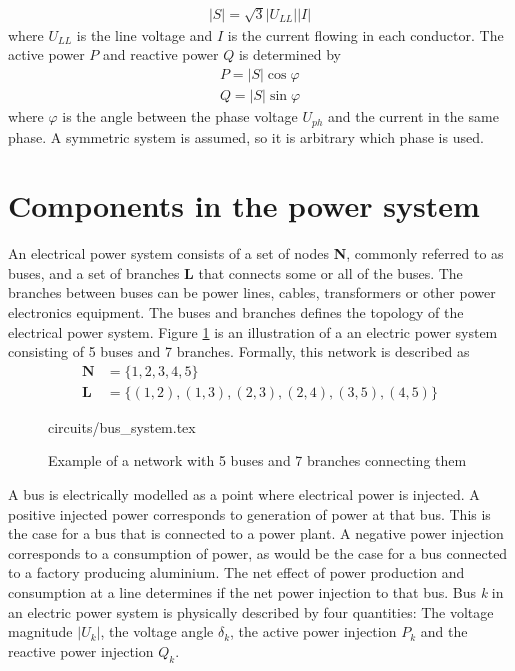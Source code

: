 \documentclass[class=book, crop=false]{standalone}
\begin{document}
\begin{equation}
   \begin{aligned}\label{eq:theory:three_phase_power}
|S| = \sqrt{3}|U_{LL}||I| 
\end{aligned} 
\end{equation}
where $U_{LL}$ is the line voltage and $I$ is the current flowing in each conductor. The active power $P$ and reactive power $Q$ is determined by 
\begin{equation}
   \begin{aligned}\label{eq:theory:three_phase_reactive}
P = |S|\cos{\varphi} \\
Q = |S|\sin{\varphi} 
\end{aligned} 
\end{equation}
where $\varphi$ is the angle between the phase voltage $U_{ph}$ and the current in the same phase. A symmetric system is assumed, so it is arbitrary which phase is used. 







\section{Components in the power system}
An electrical power system consists of a set of nodes \textbf{N}, commonly referred to as buses, and a set of branches \textbf{L} that connects some or all of the buses. The branches between buses can be power lines, cables, transformers or other power electronics equipment. The buses and branches defines the topology of the electrical power system. Figure \ref{fig:theory:bus_system} is an illustration of a an electric power system consisting of 5 buses and 7 branches. Formally, this network is described as 
\begin{equation}
   \begin{aligned}\label{eq:theory:network_set}
\textbf{N} &= \{1,2,3,4,5\}\\
\textbf{L} &= \{(1,2),(1,3),(2,3),(2,4),(3,5),(4,5)\}
\end{aligned} 
\end{equation}



\begin{figure}[ht!]
    \center
    {circuits/bus_system.tex}
    \caption[size = 9]
    {Example of a network with 5 buses and 7 branches connecting them}\label{fig:theory:bus_system}
\end{figure}
A bus is electrically modelled as a point where electrical power is injected. A positive injected power corresponds to generation of power at that bus. This is the case for a bus that is connected to a power plant. A negative power injection corresponds to a consumption of power, as would be the case for a bus connected to a factory producing aluminium. The net effect of power production and consumption at a line determines if the net power injection to that bus. Bus \textit{k} in an electric power system is physically described by four quantities: The voltage magnitude $|U_{k}|$, the voltage angle $\delta_{k}$, the active power injection $P_{k}$ and the reactive power injection $Q_{k}$.
\end{document}
